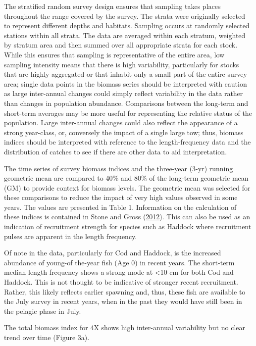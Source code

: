 \documentclass[11pt]{book}
\begin{document}

The stratified random survey design ensures that sampling takes places throughout the range covered by the survey. The strata were originally selected to represent different depths and habitats. Sampling occurs at randomly selected stations within all strata. The data are averaged within each stratum, weighted by stratum area and then summed over all appropriate strata for each stock. While this ensures that sampling is representative of the entire area, low sampling intensity means that there is high variability, particularly for stocks that are highly aggregated or that inhabit only a small part of the entire survey area; single data points in the biomass series should be interpreted with caution as large inter-annual changes could simply reflect variability in the data rather than changes in population abundance. Comparisons between the long-term and short-term averages may be more useful for representing the relative status of the population. Large inter-annual changes could also reflect the appearance of a strong year-class, or, conversely the impact of a single large tow; thus, biomass indices should be interpreted with reference to the length-frequency data and the distribution of catches to see if there are other data to aid interpretation.

The time series of survey biomass indices and the three-year (3-yr) running geometric mean are compared to 40\% and 80\% of the long-term geometric mean (GM) to provide context for biomass levels. The geometric mean was selected for these comparisons to reduce the impact of very high values observed in some years. The values are presented in Table 1. Information on the calculation of these indices is contained in Stone and Gross (\protect\hyperlink{ref-StoneGross2012}{2012}). This can also be used as an indication of recruitment strength for species such as Haddock where recruitment pulses are apparent in the length frequency.

Of note in the data, particularly for Cod and Haddock, is the increased abundance of young-of the-year fish (Age 0) in recent years. The short-term median length frequency shows a strong mode at \textless10 cm for both Cod and Haddock. This is not thought to be indicative of stronger recent recruitment. Rather, this likely reflects earlier spawning and, thus, these fish are available to the July survey in recent years, when in the past they would have still been in the pelagic phase in July.

The total biomass index for 4X shows high inter-annual variability but no clear trend over time (Figure 3a).
\end{document}
